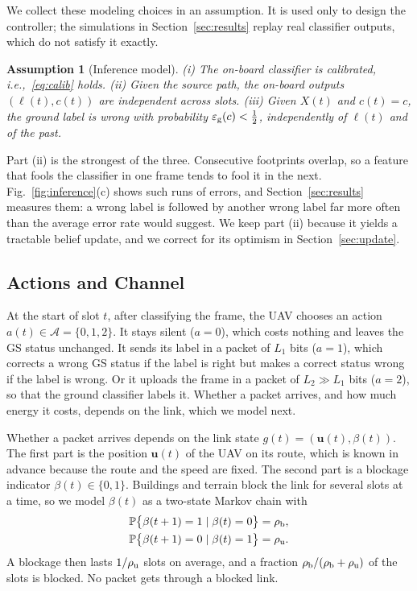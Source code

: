\documentclass[5p,twocolumn]{elsarticle}
\newtheorem{assumption}{Assumption}
\theoremstyle{remark}
\newcommand{\Prob}{\mathbb{P}}
\newcommand{\A}{\mathcal{A}}
\newcommand{\lab}{\ell}
\newcommand{\ee}{\varepsilon}
\begin{document}
We collect these modeling choices in an assumption. It is used only to design the controller; the simulations in Section~\ref{sec:results} replay real classifier outputs, which do not satisfy it exactly.

\begin{assumption}[Inference model]\label{as:inf}
(i) The on-board classifier is calibrated, i.e.,~\eqref{eq:calib} holds. (ii) Given the source path, the on-board outputs $(\lab(t),c(t))$ are independent across slots. (iii) Given $X(t)$ and $c(t)=c$, the ground label is wrong with probability $\ee_{\rm g}(c)<\tfrac12$, independently of $\lab(t)$ and of the past.
\end{assumption}

Part (ii) is the strongest of the three. Consecutive footprints overlap, so a feature that fools the classifier in one frame tends to fool it in the next. Fig.~\ref{fig:inference}(c) shows such runs of errors, and Section~\ref{sec:results} measures them: a wrong label is followed by another wrong label far more often than the average error rate would suggest. We keep part (ii) because it yields a tractable belief update, and we correct for its optimism in Section~\ref{sec:update}.

\subsection{Actions and Channel}\label{sec:act}
At the start of slot $t$, after classifying the frame, the UAV chooses an action $a(t)\in\A=\{0,1,2\}$. It stays silent ($a=0$), which costs nothing and leaves the GS status unchanged. It sends its label in a packet of $L_1$ bits ($a=1$), which corrects a wrong GS status if the label is right but makes a correct status wrong if the label is wrong. Or it uploads the frame in a packet of $L_2\gg L_1$ bits ($a=2$), so that the ground classifier labels it. Whether a packet arrives, and how much energy it costs, depends on the link, which we model next.

Whether a packet arrives depends on the link state $g(t)=(\mathbf{u}(t),\beta(t))$. The first part is the position $\mathbf{u}(t)$ of the UAV on its route, which is known in advance because the route and the speed are fixed. The second part is a blockage indicator $\beta(t)\in\{0,1\}$. Buildings and terrain block the link for several slots at a time, so we model $\beta(t)$ as a two-state Markov chain with
\begin{equation}\label{eq:block}
\begin{split}
\Prob\big\{\beta(t+1)=1\mid\beta(t)=0\big\}&=\rho_{\rm b},\\
\Prob\big\{\beta(t+1)=0\mid\beta(t)=1\big\}&=\rho_{\rm u}.
\end{split}
\end{equation}
A blockage then lasts $1/\rho_{\rm u}$ slots on average, and a fraction $\rho_{\rm b}/(\rho_{\rm b}+\rho_{\rm u})$ of the slots is blocked. No packet gets through a blocked link.
\end{document}

